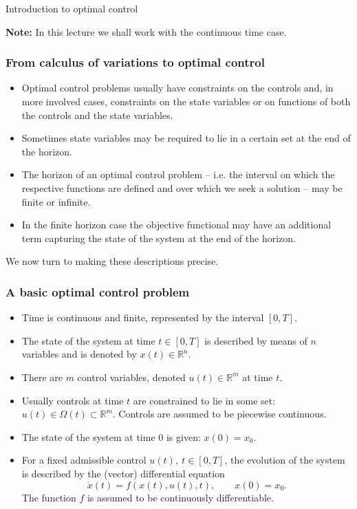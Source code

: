 \documentclass[10pt]{beamer}
\theoremstyle{definition}
\begin{document}
\begin{section}{Introduction to optimal control}
\begin{frame}[fragile]
\textbf{Note:} In this lecture we shall work with the continuous time case.
\end{frame}

\begin{frame}[fragile]
\frametitle{From calculus of variations to optimal control}
\begin{itemize}\itemsep1em
\item Optimal control problems usually have constraints on the controls and, in more involved cases, constraints on the state variables or on functions of both the controls and the state variables.
\item Sometimes state variables may be required to lie in a certain set at the end of the horizon.
\item The horizon of an optimal control problem -- i.e. the interval on which the respective functions are defined and over which we seek a solution -- may be finite or infinite.
\item In the finite horizon case the objective functional may have an additional term capturing the state of the system at the end of the horizon.
\end{itemize} \bigskip \pause

\alert{We now turn to making these descriptions precise.}
\end{frame}

\begin{frame}[fragile]
\frametitle{A basic optimal control problem}
\begin{itemize}\itemsep1em
\item Time is continuous and finite, represented by the interval $ [0,T] $.
\item The state of the system at time $ t \in [0,T] $ is described by means of $ n $ variables and is denoted by $ x(t)\in \mathbb{R}^n $.
\item There are $ m $ control variables, denoted $ u(t)\in \mathbb{R}^m $ at time $ t $. 
\item Usually controls at time $ t $ are constrained to lie in some set: $ u(t)\in \Omega (t) \subset \mathbb{R}^m $. Controls are assumed to be piecewise continuous.
\item The state of the system at time $ 0 $ is given: $ x(0)=x_0 $.
\item For a fixed admissible control $ u(t),~t\in [0,T] $, the evolution of the system is described by the (vector) differential equation  \begin{equation}
\dot{x}(t)=f(x(t),u(t),t),\qquad x(0)=x_0.
\label{eq:state}
\end{equation} The function $ f $ is assumed to be continuously differentiable.
\end{itemize}
\end{frame}


\end{section}
\end{document}
